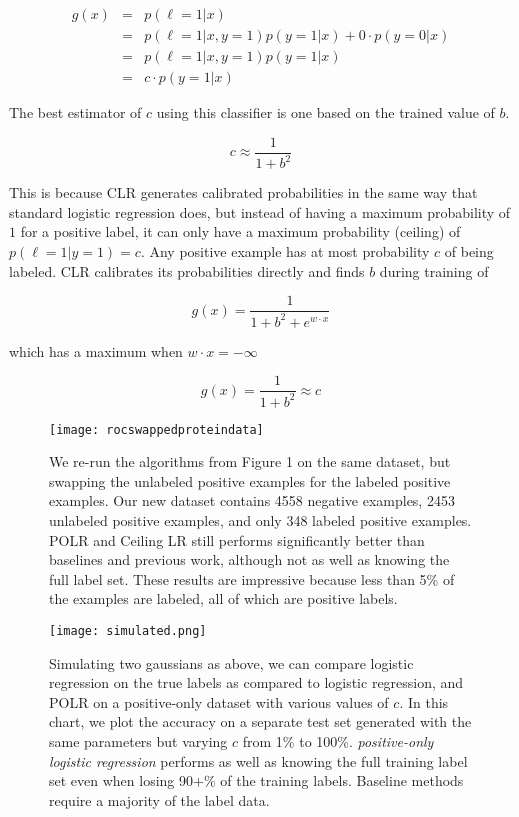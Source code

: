 \documentclass{article}
\begin{document}
\begin{eqnarray*}
g(x) &=& p(\ell=1|x) \\
 &=& p(\ell=1|x,y=1)p(y=1|x) + 0 \cdot p(y=0|x) \\
 &=& p(\ell=1|x,y=1)p(y=1|x) \\
 &=& c \cdot p(y=1|x)
\end{eqnarray*}

The best estimator of $c$ using this classifier is one based on the trained value of $b$.

$$c \approx \frac{1}{1 + b^2}$$

This is because CLR generates calibrated probabilities in the same way that standard logistic regression does, but instead of having a maximum probability of $1$ for a positive label, it can only have a maximum probability (ceiling) of $p(\ell=1|y=1)=c$. Any positive example has at most probability $c$ of being labeled.  CLR calibrates its probabilities directly and finds $b$ during training of

$$g(x) = \frac{1}{1 + b^2 + e^{w \cdot x}}$$

which has a maximum when $w \cdot x=-\infty$

$$g(x) = \frac{1}{1 + b^2} \approx c$$

\begin{figure*}[ht!]
\vskip 0.2in
\begin{center}
\centerline{\texttt{[image: rocswappedproteindata]}}
\caption{We re-run the algorithms from Figure 1 on the same dataset, but swapping the unlabeled positive examples for the labeled positive examples. Our new dataset contains 4558 negative examples, 2453 unlabeled positive examples, and only 348 labeled positive examples.  POLR and Ceiling LR still performs significantly better than baselines and previous work, although not as well as knowing the full label set.  These results are impressive because less than 5\% of the examples are labeled, all of which are positive labels.}
\label{rocswapped}
\end{center}
\vskip -0.2in
\end{figure*}

\begin{figure*}[ht!]
\vskip 0.2in
\begin{center}
\centerline{\texttt{[image: simulated.png]}}
\caption{Simulating two gaussians as above, we can compare logistic regression on the true labels as compared to logistic regression, and POLR on a positive-only dataset with various values of $c$. In this chart, we plot the accuracy on a separate test set generated with the same parameters but varying $c$ from 1\% to 100\%.  \emph{positive-only logistic regression} performs as well as knowing the full training label set even when losing 90+\% of the training labels. Baseline methods require a majority of the label data.}
\label{synthetic}
\end{center}
\vskip -0.2in
\end{figure*}
\end{document}
